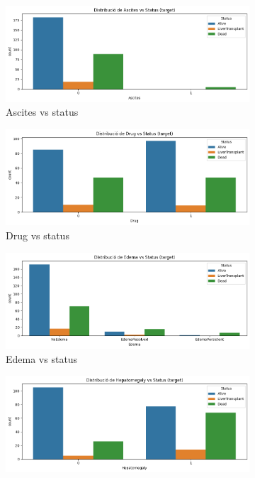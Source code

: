 \begin{figure}[H]
\centering
\begin{subfigure}[b]{0.5\textwidth}
    \includegraphics[width=\textwidth]{img/corr_Ascites_vs_status.png}
    \caption{Ascites vs status}
    \label{fig:ascites_vs_status}
\end{subfigure}%
\begin{subfigure}[b]{0.5\textwidth}
    \includegraphics[width=\textwidth]{img/corr_Drug_vs_status.png}
    \caption{Drug vs status}
    \label{fig:drug_vs_status}
\end{subfigure}
\begin{subfigure}[b]{0.5\textwidth}
    \includegraphics[width=\textwidth]{img/corr_Edema_vs_status.png}
    \caption{Edema vs status}
    \label{fig:edema_vs_status}
\end{subfigure}%
\begin{subfigure}[b]{0.5\textwidth}
    \includegraphics[width=\textwidth]{img/corr_Hepatomegaly_vs_status.png}

\end{subfigure}
\end{figure}
